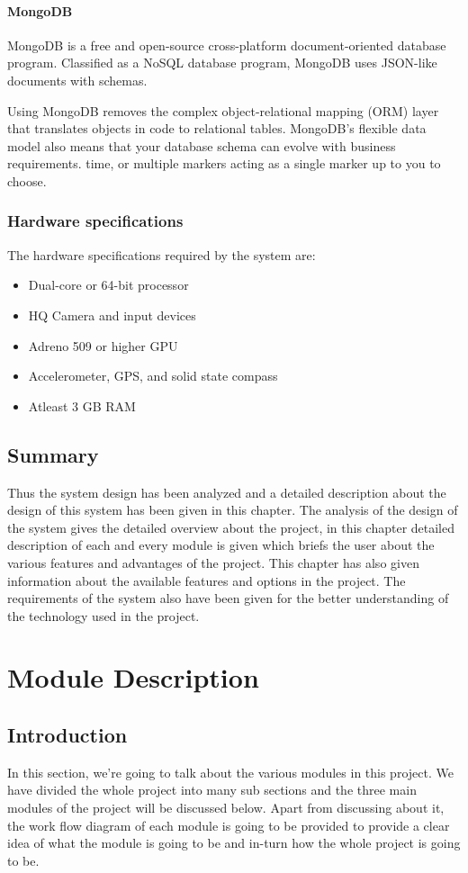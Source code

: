 \documentclass[BTech]{srmuthesis}
\begin{document}
\subsubsection{MongoDB}
MongoDB is a free and open-source cross-platform document-oriented database program. Classified as a NoSQL database program, MongoDB uses JSON-like documents with schemas. 

Using MongoDB removes the complex object-relational mapping (ORM) layer that translates objects in code to relational tables. MongoDB's flexible data model also means that your database schema can evolve with business requirements.
time, or multiple markers acting as a single marker up to you to choose.


\subsection{Hardware specifications}
The hardware specifications required by the system are:
\begin{itemize}
\item Dual-core or 64-bit processor
\item HQ Camera and input devices
\item Adreno 509 or higher GPU
\item Accelerometer, GPS, and solid state compass
\item Atleast 3 GB RAM
\end{itemize}
\section{Summary}
Thus the system design has been analyzed and a detailed description about the design of this system has been given in this chapter. The analysis of the design of the system gives the detailed overview about the project, in this chapter detailed description of each and every module is given which briefs the user about the various features and advantages of the project. This chapter has also given information about the available features and options in the project. The requirements of the system also have been given for the better understanding of the technology used in the project.

\chapter{Module Description}
\section{Introduction}
In this section, we're going to talk about the various modules in this project. We have divided the whole project into many sub sections and the three main modules of the project will be discussed below. Apart from discussing about it, the work flow diagram of each module is going to be provided to provide a clear idea of what the module is going to be and in-turn how the whole project is going to be.
\end{document}
